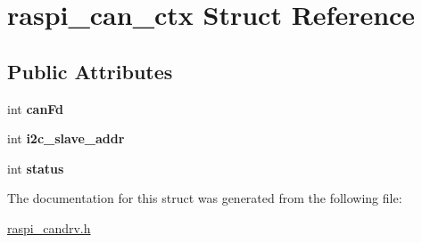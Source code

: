 \hypertarget{structraspi__can__ctx}{}\section{raspi\+\_\+can\+\_\+ctx Struct Reference}
\label{structraspi__can__ctx}
\subsection*{Public Attributes}
\begin{DoxyCompactItemize}
\item 
\hypertarget{structraspi__can__ctx_ac9fd6b7a2e6ee8823035e8cefaaec3f1}{}int {\bfseries can\+Fd}\label{structraspi__can__ctx_ac9fd6b7a2e6ee8823035e8cefaaec3f1}

\item 
\hypertarget{structraspi__can__ctx_a25b0ee2e0c96a1dd4e7c2d422b65b2b8}{}int {\bfseries i2c\+\_\+slave\+\_\+addr}\label{structraspi__can__ctx_a25b0ee2e0c96a1dd4e7c2d422b65b2b8}

\item 
\hypertarget{structraspi__can__ctx_a522713227a4bec64ea41140d6c6baa54}{}int {\bfseries status}\label{structraspi__can__ctx_a522713227a4bec64ea41140d6c6baa54}

\end{DoxyCompactItemize}


The documentation for this struct was generated from the following file\+:\begin{DoxyCompactItemize}
\item 
\hyperlink{raspi__candrv_8h}{raspi\+\_\+candrv.\+h}\end{DoxyCompactItemize}
